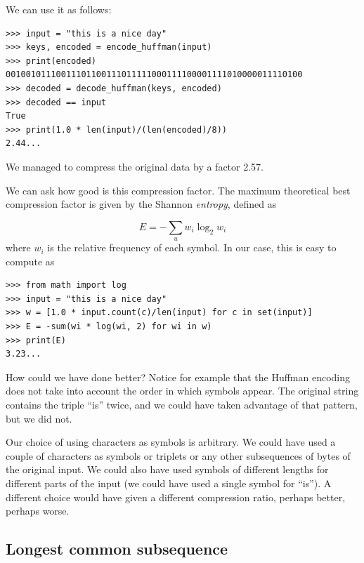 \documentclass[justified, sixbynine]{tufte-book}
\def\ft{\small\tt}
\theoremstyle{plain}%
\newtheorem * {corollary}{Corollary}
\theoremstyle{definition}
\theoremstyle{remark}
\newtheorem * {remark}{Remark}
\newtheorem * {note}{Note}
\begin{document}
\begin{fullwidth}
We can use it as follows:

\begin{lstlisting}[caption={in file: {\ft nlib.py}}]
>>> input = "this is a nice day"
>>> keys, encoded = encode_huffman(input)
>>> print(encoded)
00100101110011101100111011111000111100001111010000011110100
>>> decoded = decode_huffman(keys, encoded)
>>> decoded == input
True
>>> print(1.0 * len(input)/(len(encoded)/8))
2.44...
\end{lstlisting}

We managed to compress the original data by a factor 2.57.


We can ask how good is this compression factor.
The maximum theoretical best compression factor is given by the Shannon {\it entropy}, defined as

\begin{equation}
E = -\sum_u w_i \log_2 w_i
\end{equation}
where $w_i$ is the relative frequency of each symbol.
In our case, this is easy to compute as

\begin{lstlisting}[caption={in file: {\ft nlib.py}}]
>>> from math import log
>>> input = "this is a nice day"
>>> w = [1.0 * input.count(c)/len(input) for c in set(input)]
>>> E = -sum(wi * log(wi, 2) for wi in w)
>>> print(E)
3.23...
\end{lstlisting}

How could we have done better? Notice for example that the Huffman encoding does not take into account the order in which symbols appear. The original string contains the triple ``is'' twice, and we could have taken advantage of that pattern, but we did not.

Our choice of using characters as symbols is arbitrary. We could have used a couple of characters as symbols or triplets or any other subsequences of bytes of the original input. We could also have used symbols of different lengths for different parts of the input (we could have used a single symbol for ``is''). A different choice would have given a different compression ratio, perhaps better, perhaps worse.

\subsection{Longest common subsequence}



\end{fullwidth}
\end{document}
